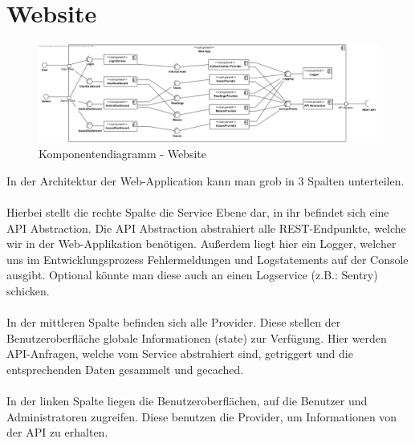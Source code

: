 
\section{Website}

\begin{figure}[h]
	\includegraphics[scale = 0.45]{./img/diagrams/Website-Components} 	
	\caption{Komponentendiagramm - Website} 
\end{figure} \noindent
In der Architektur der Web-Application kann man grob in 3 Spalten unterteilen. 
\\ \\
Hierbei stellt die rechte Spalte die Service Ebene dar, in ihr befindet sich eine API Abstraction. Die API Abstraction abstrahiert alle REST-Endpunkte, welche wir in der Web-Applikation benötigen. Außerdem liegt hier ein Logger, welcher uns im Entwicklungsprozess Fehlermeldungen und Logstatements auf der Console ausgibt. Optional könnte man diese auch an einen Logservice (z.B.: Sentry) schicken.
\\ \\
In der mittleren Spalte befinden sich alle Provider. Diese stellen der Benutzeroberfläche globale Informationen (state) zur Verfügung. Hier werden API-Anfragen, welche vom Service abstrahiert sind, getriggert und die entsprechenden Daten gesammelt und gecached.
\\ \\
In der linken Spalte liegen die Benutzeroberflächen, auf die Benutzer und Administratoren zugreifen. Diese benutzen die Provider, um Informationen von der API zu erhalten.
\newpage
